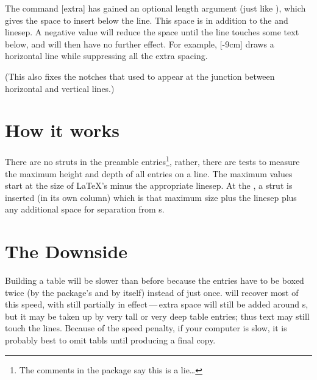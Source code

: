 \documentclass[a4paper]{article}
\begin{document}
The command [extra] has gained an optional length
argument (just like \bsbs), which gives the space to insert below the
line.  This space is in addition to the  and
linesep.  A negative value will reduce the space until the line
touches some text below, and will then have no further effect.  For
example, [-9cm] draws a horizontal line while
suppressing all the extra spacing.

(This  also fixes the notches that used to appear at the
junction between horizontal and vertical lines.)

\section{How it works}

There are no struts in the preamble entries\footnote{The comments in
  the package say this is a lie\dots}, rather, there are tests to
measure the maximum height and depth of all entries on a line.  The
maximum values start at the size of LaTeX's  minus the
appropriate linesep.  At the \bsbs, a strut is inserted (in its own
column) which is that maximum size plus the linesep plus any
additional space for separation from s.

\section{The Downside}

Building a table will be slower than before because the entries have
to be boxed twice (by the package's  and by 
itself) instead of just once.
 will recover most of this
speed, with  still partially in effect\,---\,extra
space will still be added around s, but it may be taken up
by very tall or very deep table entries; thus text may still touch the
lines.  Because of the speed penalty, if your computer is slow, it is
probably best to omit \textsf{tabls} until producing a final copy.
\end{document}
